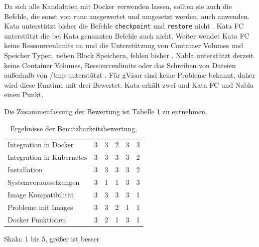 Da sich alle Kandidaten mit Docker verwenden lassen, sollten sie auch die Befehle, die sonst von runc ausgewertet und umgesetzt werden, auch anwenden. Kata unterstützt bisher die Befehle \lstinline[]|checkpoint| und \lstinline[]|restore| nicht \cite[vgl.][]{KataContainers.20190919}. Kata FC unterstützt die bei Kata genannten Befehle auch nicht. Weiter wendet Kata FC keine Ressourcenlimits an und die Unterstützung von Container Volumes und Speicher Typen, neben Block Speichern, fehlen bisher \cite[vgl.][]{katacontainers.20190123}. Nabla unterstützt derzeit keine  Container Volumes, Ressourcenlimits oder das Schreiben von Dateien außerhalb von /tmp unterstützt \cite[vgl.][]{nablacontainers.20190402}. Für gVisor sind keine Probleme bekannt, daher wird diese Runtime mit drei Bewertet. Kata erhält zwei und Kata FC und Nabla einen Punkt.

Die Zusammenfassung der Bewertung ist Tabelle \ref{tbl:benutzbarkeit_ergebnis} zu entnehmen. 


\begin{table}[hb]
	\myfloatalign
	\small
	\begin{tabularx}{\textwidth}{Xrrrrr} \hline
		\spacedlowsmallcaps{Kriterium} & \spacedlowsmallcaps{Docker} & \spacedlowsmallcaps{Kata} & \spacedlowsmallcaps{Kata FC} &  \spacedlowsmallcaps{gVisor} & \spacedlowsmallcaps{Nabla} \\ \hline
		Integration in Docker                                        & 3      & 3    & 2       & 3      & 3     \\
		Integration in Kubernetes                                    & 3      & 3    & 3       & 3      & 2     \\
		Installation                                                 & 3      & 3    & 3       & 3      & 2     \\
		Systemvoraussetzungen                                        & 3      & 1    & 1       & 3      & 3     \\
		Image Kompatibilität                                  & 3      & 3    & 3       & 3      & 1     \\
		Probleme mit Images                    & 3      & 3    & 2       & 1      & 1     \\
		Docker Funktionen                         & 3      & 2    & 1       & 3      & 1     \\ \hline
	\end{tabularx}
	\caption[Ergebnisse der Benutzbarkeitsbewertung]{Ergebnisse der Benutzbarkeitsbewertung,}
	\footnotesize Skala: 1 bis 5, größer ist besser
	\label{tbl:benutzbarkeit_ergebnis}
\end{table}

